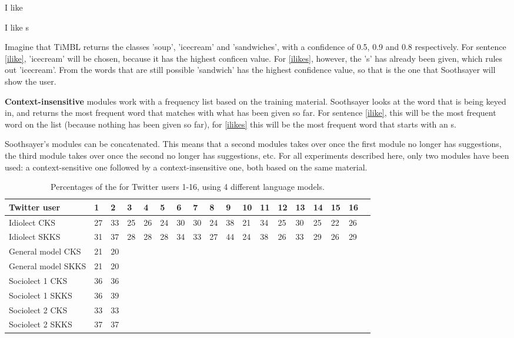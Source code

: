 \documentclass[11pt]{article}
\begin{document}
\begin{examples}
\item I like \label{ilike}
\item I like s \label{ilikes}
\end{examples}

Imagine that TiMBL returns the classes 'soup', 'icecream' and 'sandwiches', with a confidence of 0.5, 0.9 and 0.8 respectively. For sentence \ref{ilike}, 'icecream' will be chosen, because it has the highest conficen value. For \ref{ilikes}, however, the 's' has already been given, which rules out 'icecream'. From the words that are still possible 'sandwich' has the highest confidence value, so that is the one that Soothsayer will show the user.

\textbf{Context-insensitive} modules work with a frequency list based on the training material. Soothsayer looks at the word that is being keyed in, and returns the most frequent word that matches with what has been given so far. For sentence \ref{ilike}, this will be the most frequent word on the list (because nothing has been given so far), for \ref{ilikes} this will be the most frequent word that starts with an s.

Soothsayer's modules can be concatenated. This means that a second modules takes over once the first module no longer has suggestions, the third module takes over once the second no longer has suggestions, etc. For all experiments described here, only two modules have been used: a context-sensitive one followed by a context-insensitive one, both based on the same material.

\begin{table*}[t]
\begin{tabular}{l|*{17}{l}}
Twitter user&1&2&3&4&5&6&7&8&9&10&11&12&13&14&15&16\\
\hline
Idiolect CKS&27&33&25&26&24&30&30&24&38&21&34&25&30&25&22&26\\
Idiolect SKKS&31&37&28&28&28&34&33&27&44&24&38&26&33&29&26&29\\
\hline
General model CKS&21&20\\
General model SKKS&21&20\\
\hline
Sociolect 1 CKS&36&36\\
Sociolect 1 SKKS&36&39\\
\hline
Sociolect 2 CKS&33&33\\
Sociolect 2 SKKS&37&37\\
\end{tabular}
\caption{Percentages of the for Twitter users 1-16, using 4 different language models.}
\label{result1}
\end{table*}
\end{document}
